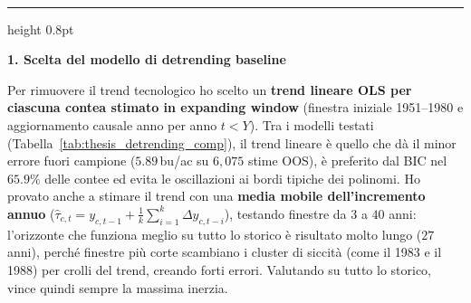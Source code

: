 \documentclass[10pt,a4paper]{article}
\begin{document}
\\[0.2em]
\vspace{0.25em}
\hrule height 0.8pt
\vspace{0.45em}

\noindent \textbf{\large 1. Scelta del modello di detrending baseline}
\vspace{0.15em}

\noindent Per rimuovere il trend tecnologico ho scelto un \textbf{trend lineare OLS per ciascuna contea stimato in expanding window} (finestra iniziale 1951--1980 e aggiornamento causale anno per anno $t < Y$). Tra i modelli testati (Tabella~\ref{tab:thesis_detrending_comp}), il trend lineare è quello che dà il minor errore fuori campione ($5.89$\,bu/ac su $6{,}075$ stime OOS), è preferito dal BIC nel $65.9\%$ delle contee ed evita le oscillazioni ai bordi tipiche dei polinomi. Ho provato anche a stimare il trend con una \textbf{media mobile dell'incremento annuo} ($\hat{\tau}_{c,t} = y_{c,t-1} + \frac{1}{k}\sum_{i=1}^k \Delta y_{c,t-i}$), testando finestre da $3$ a $40$ anni: l'orizzonte che funziona meglio su tutto lo storico è risultato molto lungo ($27$ anni), perché finestre più corte scambiano i cluster di siccità (come il 1983 e il 1988) per crolli del trend, creando forti errori. Valutando su tutto lo storico, vince quindi sempre la massima inerzia.
\end{document}
